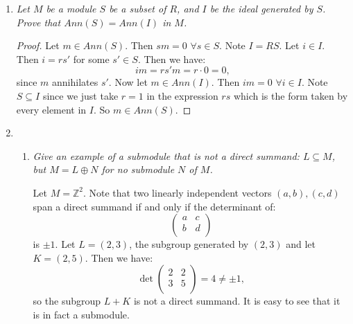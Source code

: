 \documentclass[12pt]{amsbook}
\theoremstyle{plain}
\numberwithin{section}{chapter}
\numberwithin{equation}{chapter}
\theoremstyle{definition}
\theoremstyle{remark}
\newcommand{\sub}{\subseteq}
\newcommand{\z}{\mathbb{Z}}
\newcommand{\bb}{\vspace{3mm}}
\begin{document}
\begin{enumerate}[label=\arabic*.]
\begin{proof}
Let $I = (a_1),J = (a_2)$. Then since we are in a PID, we know $Ann(a_1) = Ann(I)$ and the same for $J$. Then note that $I,J$ are comaximal since $a_1,a_2$ are relatively prime, and we are in a PID, thus $I + J = (1) = R$. Also note that $Ann(a_1a_2) = Ann(I \cap J)$ since $(a_1a_2) = (a_1) \cap (a_2)$.  Let $m \in Ann(I + J) = Ann((1)) = Ann(R)$ since $I,J$ are comaximal, and $R$ is commutative and unital. So $rm = 0$ for all $r \in R$. So then $m \in Ann(I)$, and since $0 \in Ann(J)$, we may write $m = m + 0$, so $m \in Ann(I) + Ann(J)$. And thus $Ann(I + J) \sub Ann(I) + Ann(J)$. The other inclusion is trivial. So we have that $Ann(a_1a_2) = Ann(a_1) + Ann(a_2)$. By Theorem \ref{thm10.67}, we have have that their intersection is trivial since if $m \neq 0$ and $a_1m = 0$ and $a_2m = 0$. Since $a_1,a_2$ are coprime we have $r,s \in R$ s.t. $ra_1 + sa_2 = 1$. So we also have $ra_1m = 0$ and $sa_2m = 0$.  So then we have:
$$
(ra_1 + sa_2)m = 1m = m = 0.
$$
So $Ann(a_1) \cap Ann(a_2) = 0$. So by Theorem \ref{thm10.67} we know $Ann(a_1a_2) = Ann(a_1) \oplus Ann(a_2)$. 
\end{proof}

\item \textit{Let $M$ be a module $S$ be a subset of $R$, and $I$ be the ideal generated by $S$. Prove that $Ann(S) = Ann(I)$ in $M$. }

\begin{proof}
Let $m \in Ann(S)$. Then $sm = 0$ $\forall s \in S$. Note $I = RS$. Let $i \in I$. Then $i = rs'$ for some $s' \in S$. Then we have: 
$$
im = rs'm = r\cdot 0 = 0,
$$
 since $m$ annihilates $s'$. Now let $m \in Ann(I)$. Then $im = 0$ $\forall i \in I$. Note $S \sub I$ since we just take $r = 1$ in the expression $rs$ which is the form taken by every element in $I$. So $m \in Ann(S)$. 
\end{proof}

\item 
\begin{enumerate}
\item 
\textit{Give an example of a submodule that is not a direct summand: $L \sub M$, but $M = L \oplus N$ for no submodule $N$ of $M$. }

Let $M = \z^2$. Note that two linearly independent vectors $(a,b),(c,d)$ span a direct summand if and only if the determinant of:
$$\left(
\begin{matrix}
a & c\\
b & d\\
\end{matrix}
\right)
$$
is $\pm 1$. Let $L = (2,3)$, the subgroup generated by $(2,3)$ and let $K = (2,5)$. Then we have:
$$
\det\left(
\begin{matrix}
2 & 2\\
3 & 5\\
\end{matrix}
\right) = 4 \neq \pm 1,
$$
so the subgroup $L + K$ is not a direct summand. It is easy to see that it is in fact a submodule. \bb


\end{enumerate}
\end{enumerate}
\end{document}
